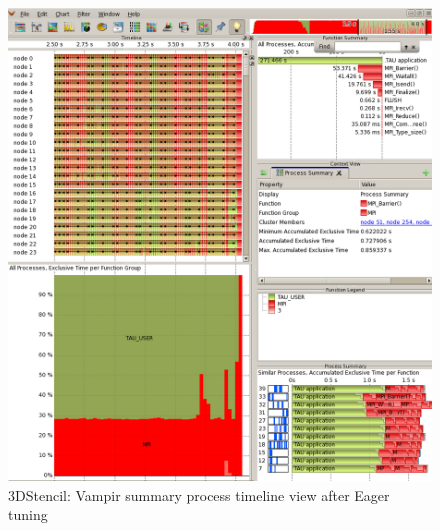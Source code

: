  \begin{figure}[tbp!]
  \centering
  \captionsetup{justification=centering}
  \includegraphics[scale=1.0,width=\columnwidth,keepaspectratio]{figures/Overlap-after}
         \caption{3DStencil: Vampir summary process timeline view after Eager tuning}
 \label{fig:aftereager}
 \end{figure}


